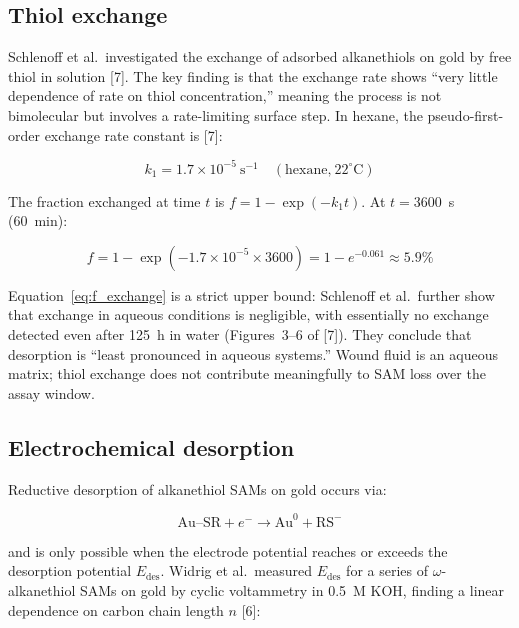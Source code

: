 \documentclass[10pt,a4paper]{article}
\numberwithin{equation}{section}
\newcommand{\cit}[1]{[#1]}   %
\begin{document}
\subsection{Thiol exchange}

Schlenoff et al.\ investigated the exchange of adsorbed alkanethiols on gold by free
thiol in solution \cit{7}. The key finding is that the exchange rate shows ``very little
dependence of rate on thiol concentration,'' meaning the process is not bimolecular but
involves a rate-limiting surface step. In hexane, the pseudo-first-order exchange rate
constant is \cit{7}:

\begin{equation}
  k_1 = 1.7 \times 10^{-5}\ \text{s}^{-1} \quad (\text{hexane,}\ 22^\circ\text{C})
  \label{eq:k1}
\end{equation}

The fraction exchanged at time $t$ is $f = 1 - \exp(-k_1 t)$. At $t = 3600$~s (60~min):

\begin{equation}
  f = 1 - \exp(-1.7 \times 10^{-5} \times 3600)
    = 1 - e^{-0.061}
    \approx 5.9\%
  \label{eq:f_exchange}
\end{equation}

Equation~\eqref{eq:f_exchange} is a strict upper bound: Schlenoff et al.\ further show
that exchange in aqueous conditions is negligible, with essentially no exchange detected
even after 125~h in water (Figures~3--6 of \cit{7}). They conclude that desorption is
``least pronounced in aqueous systems.'' Wound fluid is an aqueous matrix; thiol exchange
does not contribute meaningfully to SAM loss over the assay window.

\subsection{Electrochemical desorption}

Reductive desorption of alkanethiol SAMs on gold occurs via:

\begin{equation}
  \text{Au--SR} + e^- \longrightarrow \text{Au}^0 + \text{RS}^-
  \label{eq:red_des}
\end{equation}

and is only possible when the electrode potential reaches or exceeds the desorption
potential $E_{\mathrm{des}}$. Widrig et al.\ measured $E_{\mathrm{des}}$ for a series of
$\omega$-alkanethiol SAMs on gold by cyclic voltammetry in 0.5~M KOH, finding a linear
dependence on carbon chain length $n$ \cit{6}:
\end{document}

